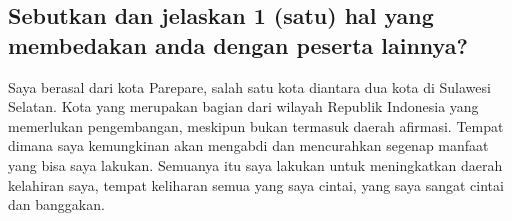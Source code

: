 \documentclass[../main.tex]{subfiles}
\begin{document}
\subsection{Sebutkan dan jelaskan 1 (satu) hal yang membedakan anda dengan peserta lainnya?}

Saya berasal dari kota Parepare, salah satu kota diantara dua kota di Sulawesi Selatan. Kota yang merupakan bagian dari wilayah Republik Indonesia yang memerlukan pengembangan, meskipun bukan termasuk daerah afirmasi. Tempat dimana saya kemungkinan akan mengabdi dan mencurahkan segenap manfaat yang bisa saya lakukan. Semuanya itu saya lakukan untuk meningkatkan daerah kelahiran saya, tempat keliharan semua yang saya cintai, yang saya sangat cintai dan banggakan.










%
%
\end{document}
